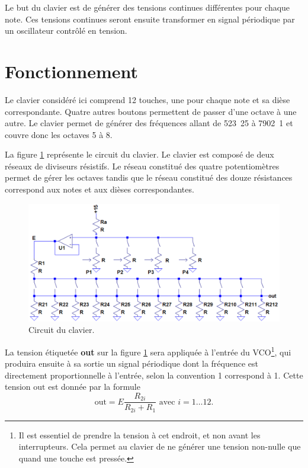 
Le but du clavier est de générer des tensions continues
différentes pour chaque note. Ces tensions continues
seront ensuite transformer en signal périodique par un
oscillateur contrôlé en tension.

\section{Fonctionnement}
Le clavier considéré ici comprend 12 touches, une pour
chaque note et sa dièse correspondante. Quatre autres
boutons permettent de passer d'une octave à une autre.
Le clavier permet de générer des fréquences allant de
\unit{523.25}{\hertz} à \unit{7902.1}{\hertz} et couvre
donc les octaves 5 à 8.

La figure \ref{fig:keyboard-circuit} représente le
circuit du clavier. Le clavier est composé de deux
réseaux de diviseurs résistifs. Le réseau constitué
des quatre potentiomètres permet de gérer les octaves
tandis que le réseau constitué des douze résistances
correspond aux notes et aux dièses correspondantes.

\begin{figure}[ht]
	\centering
	\includegraphics[scale=0.5]{img-keyboard/keyboard-circuit.png}
	\caption{Circuit du clavier.}
	\label{fig:keyboard-circuit}
\end{figure}

La tension étiquetée \textbf{out} sur la figure
\ref{fig:keyboard-circuit} sera appliquée à l'entrée
du VCO\footnote{Il est essentiel de prendre la tension à cet
endroit, et non avant les interrupteurs. Cela permet au clavier
de ne générer une tension non-nulle que quand une touche est pressée.},
qui produira ensuite à sa sortie un signal
périodique dont la fréquence est directement 
proportionnelle à l'entrée, selon la convention
\unit{1}{\milli\volt} correspond à \unit{1}{\hertz}. Cette
tension $\text{out}$ est donnée par la formule 
\[ \text{out} = E\frac{R_{2i}}{R_{2i} + R_1} \text{  avec  } i = 1\dots12. \]

